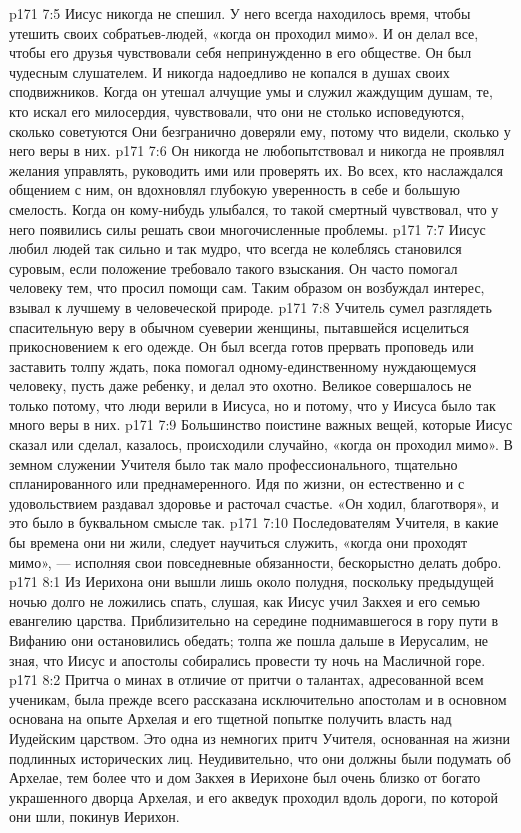 \vs p171 7:5 Иисус никогда не спешил. У него всегда находилось время, чтобы утешить своих собратьев\hyp{}людей, «когда он проходил мимо». И он делал все, чтобы его друзья чувствовали себя непринужденно в его обществе. Он был чудесным слушателем. И никогда надоедливо не копался в душах своих сподвижников. Когда он утешал алчущие умы и служил жаждущим душам, те, кто искал его милосердия, чувствовали, что они не столько  исповедуются, сколько советуются  Они безгранично доверяли ему, потому что видели, сколько у него веры в них.
\vs p171 7:6 Он никогда не любопытствовал и никогда не проявлял желания управлять, руководить ими или проверять их. Во всех, кто наслаждался общением с ним, он вдохновлял глубокую уверенность в себе и большую смелость. Когда он кому\hyp{}нибудь улыбался, то такой смертный чувствовал, что у него появились силы решать свои многочисленные проблемы.
\vs p171 7:7 Иисус любил людей так сильно и так мудро, что всегда не колеблясь становился суровым, если положение требовало такого взыскания. Он часто помогал человеку тем, что просил помощи сам. Таким образом он возбуждал интерес, взывал к лучшему в человеческой природе.
\vs p171 7:8 Учитель сумел разглядеть спасительную веру в обычном суеверии женщины, пытавшейся исцелиться прикосновением к его одежде. Он был всегда готов прервать проповедь или заставить толпу ждать, пока помогал одному\hyp{}единственному нуждающемуся человеку, пусть даже ребенку, и делал это охотно. Великое совершалось не только потому, что люди верили в Иисуса, но и потому, что у Иисуса было так много веры в них.
\vs p171 7:9 Большинство поистине важных вещей, которые Иисус сказал или сделал, казалось, происходили случайно, «когда он проходил мимо». В земном служении Учителя было так мало профессионального, тщательно спланированного или преднамеренного. Идя по жизни, он естественно и с удовольствием раздавал здоровье и расточал счастье. «Он ходил, благотворя», и это было в буквальном смысле так.
\vs p171 7:10 Последователям Учителя, в какие бы времена они ни жили, следует научиться служить, «когда они проходят мимо», --- исполняя свои повседневные обязанности, бескорыстно делать добро.
\vs p171 8:1 Из Иерихона они вышли лишь около полудня, поскольку предыдущей ночью долго не ложились спать, слушая, как Иисус учил Закхея и его семью евангелию царства. Приблизительно на середине поднимавшегося в гору пути в Вифанию они остановились обедать; толпа же пошла дальше в Иерусалим, не зная, что Иисус и апостолы собирались провести ту ночь на Масличной горе.
\vs p171 8:2 Притча о минах в отличие от притчи о талантах, адресованной всем ученикам, была прежде всего рассказана исключительно апостолам и в основном основана на опыте Архелая и его тщетной попытке получить власть над Иудейским царством. Это одна из немногих притч Учителя, основанная на жизни подлинных исторических лиц. Неудивительно, что они должны были подумать об Архелае, тем более что и дом Закхея в Иерихоне был очень близко от богато украшенного дворца Архелая, и его акведук проходил вдоль дороги, по которой они шли, покинув Иерихон.
